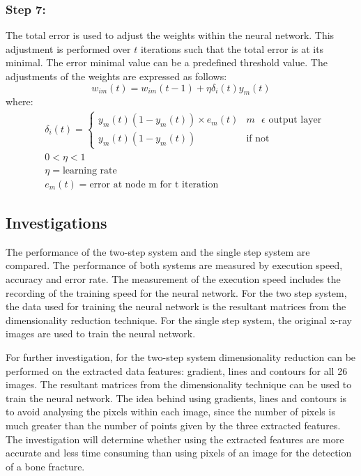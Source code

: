 \documentclass[11pt,twocolumn]{witseiepaper}
\begin{document}
	\subsubsection{Step 7:}
	The total error is used to adjust the weights within the neural network. This adjustment is performed over $t$ iterations such that the total error is at its minimal. The error minimal value can be a predefined threshold value. The adjustments of the weights are expressed as follows:
	\begin{equation}
		w_{im}(t) = w_{im}(t-1)+\eta\delta_i(t)y_m(t)
	\end{equation}
	where:
	\begin{align*}
		& \delta_i(t) = 
		\begin{cases}
			y_m(t)(1 - y_m(t))\times e_m(t) & m \text{ } \epsilon \text{ output layer}\\
			y_m(t)(1 - y_m(t)) & \text{if not}
		\end{cases} \\
		& 0 < \eta < 1 \\
		& \eta = \text{learning rate} \\
		& e_m(t) = \text{error at node m for t iteration}
	\end{align*}
	
	\subsection{Investigations}
	The performance of the two-step system and the single step system are compared. The performance of both systems are measured by execution speed, accuracy and error rate. The measurement of the execution speed includes the recording of the training speed for the neural network. For the two step system, the data used for training the neural network is the resultant matrices from the dimensionality reduction technique. For the single step system, the original x-ray images are used to train the neural network. 
	
	For further investigation, for the two-step system dimensionality reduction can be performed on the extracted data features: gradient, lines and contours for all 26 images. The resultant matrices from the dimensionality technique can be used to train the neural network. The idea behind using gradients, lines and contours is to avoid analysing the pixels within each image, since the number of pixels is much greater than the number of points given by the three extracted features. The investigation will determine whether using the extracted features are more accurate and less time consuming than using pixels of an image for the detection of a bone fracture.
	
\end{document}
